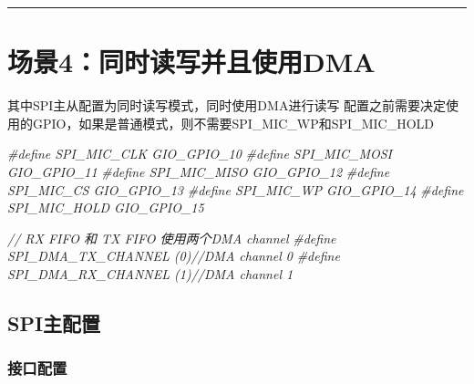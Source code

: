 \documentclass[
  12pt,
]{book}
\newenvironment{Shaded}{\begin{snugshade}}{\end{snugshade}}
\newcommand{\CommentTok}[1]{\textcolor[rgb]{0.56,0.35,0.01}{\textit{#1}}}
\newcommand{\PreprocessorTok}[1]{\textcolor[rgb]{0.56,0.35,0.01}{\textit{#1}}}
\begin{document}
\begin{center}\rule{0.5\linewidth}{0.5pt}\end{center}

\hypertarget{ux573aux666f4ux540cux65f6ux8bfbux5199ux5e76ux4e14ux4f7fux7528dma}{%
\section{场景4：同时读写并且使用DMA}\label{ux573aux666f4ux540cux65f6ux8bfbux5199ux5e76ux4e14ux4f7fux7528dma}}

其中SPI主从配置为同时读写模式，同时使用DMA进行读写 配置之前需要决定使用的GPIO，如果是普通模式，则不需要SPI\_MIC\_WP和SPI\_MIC\_HOLD

\begin{Shaded}
\begin{Highlighting}[]
\PreprocessorTok{#define SPI_MIC_CLK         GIO_GPIO_10}
\PreprocessorTok{#define SPI_MIC_MOSI        GIO_GPIO_11}
\PreprocessorTok{#define SPI_MIC_MISO        GIO_GPIO_12}
\PreprocessorTok{#define SPI_MIC_CS          GIO_GPIO_13}
\PreprocessorTok{#define SPI_MIC_WP          GIO_GPIO_14}
\PreprocessorTok{#define SPI_MIC_HOLD        GIO_GPIO_15}

\CommentTok{// RX FIFO 和 TX FIFO 使用两个DMA channel}
\PreprocessorTok{#define SPI_DMA_TX_CHANNEL   (0)}\CommentTok{//DMA channel 0}
\PreprocessorTok{#define SPI_DMA_RX_CHANNEL   (1)}\CommentTok{//DMA channel 1}
\end{Highlighting}
\end{Shaded}

\hypertarget{spiux4e3bux914dux7f6e-3}{%
\subsection{SPI主配置}\label{spiux4e3bux914dux7f6e-3}}

\hypertarget{ux63a5ux53e3ux914dux7f6e-6}{%
\subsubsection{接口配置}\label{ux63a5ux53e3ux914dux7f6e-6}}
\end{document}

